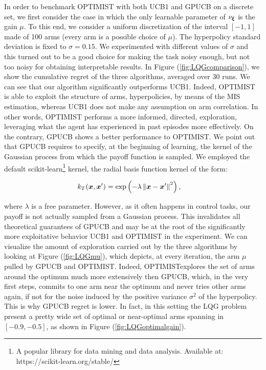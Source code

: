 In order to benchmark \gls{OPTIMIST} with both \gls{UCB}1 and \gls{GPUCB} on a discrete set, we first consider the case in which the only learnable parameter of $\nu_{\boldsymbol{\xi}}$ is the gain $\mu$. To this end, we consider a uniform discretization of the interval $[-1,1]$ made of 100 arms (every arm is a possible choice of $\mu$). The hyperpolicy standard deviation is fixed to $\sigma=0.15$. We experimented with different values of $\sigma$ and this turned out to be a good choice for making the task noisy enough, but not too noisy for obtaining interpretable results. In Figure (\ref{fig:LQGcomparison}), we show the cumulative regret of the three algorithms, averaged over 30 runs. We can see that our algorithm significantly outperforms \gls{UCB}1.
Indeed, \gls{OPTIMIST} is able to exploit the structure of arms, \ie hyperpolicies, by means of the \gls{MIS} estimation, whereas \gls{UCB}1 does not make any assumption on arm correlation. In other words, \gls{OPTIMIST} performs a more informed, \ie directed, exploration, leveraging what the agent has experienced in past episodes more effectively. On the contrary, \gls{GPUCB} shows a better performance \wrt to \gls{OPTIMIST}. We point out that \gls{GPUCB} requires to specify, at the beginning of learning, the kernel of the Gaussian process from which the payoff function is sampled. We employed the default scikit-learn\footnote{A popular library for data mining and data analysis. Available at: https://scikit-learn.org/stable/} kernel, \ie the radial basis function kernel of the form:

\begin{align}
	k_T(\boldsymbol{x},\boldsymbol{x}') &= \exp\left(-\lambda\left\|\boldsymbol{x}-\boldsymbol{x}'\right\|_{}^2\right),
\end{align}

where $\lambda$ is a free parameter. However, as it often happens in control tasks, our payoff is not actually sampled from a Gaussian process. This invalidates all theoretical guarantees of \gls{GPUCB} and may be at the root of the significantly more exploitative behavior \wrt \gls{UCB}1 and \gls{OPTIMIST} in the experiment. We can visualize the amount of exploration carried out by the three algorithms by looking at Figure (\ref{fig:LQGmu}), which depicts, at every iteration, the arm $\mu$ pulled by \gls{GPUCB} and \gls{OPTIMIST}. Indeed, \gls{OPTIMIST}explores the set of arms around the optimum much more extensively then \gls{GPUCB}, which, in the very first steps, commits to one arm near the optimum and never tries other arms again, if not for the noise induced by the positive variance $\sigma^2$ of the hyperpolicy. This is why \gls{GPUCB} regret is lower. In fact, in this setting the \gls{LQG} problem present a pretty wide set of optimal or near-optimal arms spanning in $[-0.9,-0.5]$, as shown in Figure (\ref{fig:LQGoptimalgain}).


